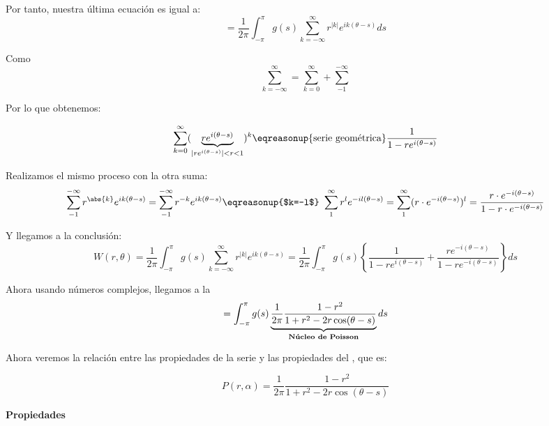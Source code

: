 		Por tanto, nuestra última ecuación es igual a:
		\[ = \frac{1}{2\pi} \int_{-\pi}^{\pi} g(s) \sum_{k=-\infty}^{\infty} r^{|k|} e^{ik(\theta-s)} ds \]

		Como $$\sum\limits_{k=-\infty}^{\infty} = \sum\limits_{k=0}^{\infty} + \sum\limits_{-1}^{-\infty}$$

		Por lo que obtenemos:

		\[
		\sum_{k=0}^{\infty} (\underbrace{r e^{i (\theta-s)}}_{|re^{i(\theta-s)}| < r < 1})^k \eqreasonup{\text{serie geométrica}} \frac{1}{1-re^{i(\theta-s)}}
		\]

		Realizamos el mismo proceso con la otra suma:
		\begin{gather*}
			\sum\limits_{-1}^{-\infty} r^{\abs{k}} e^{ik(\theta-s)} = \sum\limits_{-1}^{-\infty} r^{-k} e^{ik(\theta-s)} \eqreasonup{$k=-l$} \ \sum\limits_{1}^{\infty} r^{l} e^{-il(\theta-s)} = \sum\limits_{1}^{\infty} (r \cdot e^{-i(\theta-s)})^l = \frac{r \cdot e^{-i(\theta-s)}}{1-r \cdot e^{-i(\theta-s)}}
		\end{gather*}

		Y llegamos a la conclusión:
		\[
		W(r,\theta) = \frac{1}{2\pi} \int_{-\pi}^\pi g(s) \sum_{k=-\infty}^\infty r^{|k|} e^{ik(\theta-s)} = \frac{1}{2\pi} \int_{-\pi}^\pi g(s) \left\{ \frac{1}{1-re^{i(\theta-s)}} + \frac{re^{-i(\theta-s)}}{1-re^{-i(\theta-s)}} \right\} ds	\]

		Ahora usando números complejos, llegamos a la 
		\[ = \int^{\pi}_{-\pi} g(s) \underbrace{\frac{1}{2\pi} \frac{1-r^2}{1+r^2-2r\cos (\theta - s)}}_{\text{\bf Núcleo de Poisson}} ds \]

		Ahora veremos la relación entre las propiedades de la serie y las propiedades del , que es:

		\[P(r,\alpha) = \frac{1}{2\pi} \frac{1-r^2}{1+r^2-2r\cos (\theta - s)} \]


		\textbf{Propiedades}

